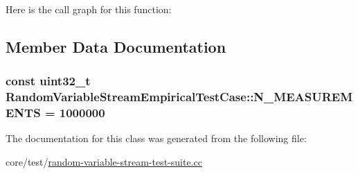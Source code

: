Here is the call graph for this function\+:




\subsection{Member Data Documentation}
\subsubsection[{\texorpdfstring{N\+\_\+\+M\+E\+A\+S\+U\+R\+E\+M\+E\+N\+TS}{N_MEASUREMENTS}}]{\setlength{\rightskip}{0pt plus 5cm}const uint32\+\_\+t Random\+Variable\+Stream\+Empirical\+Test\+Case\+::\+N\+\_\+\+M\+E\+A\+S\+U\+R\+E\+M\+E\+N\+TS = 1000000\hspace{0.3cm}{\ttfamily [static]}}\hypertarget{classRandomVariableStreamEmpiricalTestCase_af8f4a8c6d7df99808673e6bbde2d7ddc}{}\label{classRandomVariableStreamEmpiricalTestCase_af8f4a8c6d7df99808673e6bbde2d7ddc}


The documentation for this class was generated from the following file\+:\begin{DoxyCompactItemize}
\item 
core/test/\hyperlink{random-variable-stream-test-suite_8cc}{random-\/variable-\/stream-\/test-\/suite.\+cc}\end{DoxyCompactItemize}
